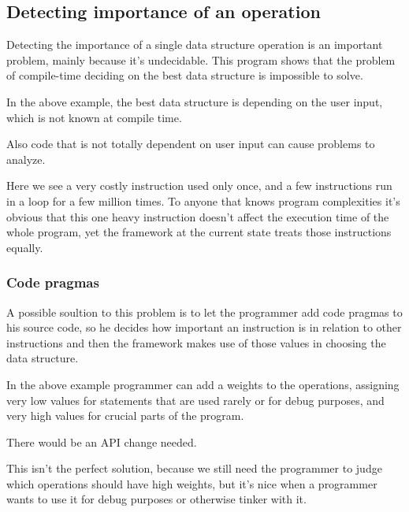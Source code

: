 \documentclass[11pt]{article}
\begin{document}
	\subsection{Detecting importance of an operation}
		Detecting the importance of a single data structure operation is an important problem, mainly because it's undecidable.
		This program shows that the problem of compile-time deciding on the best data structure is impossible to solve.
		
		In the above example, the best data structure is depending on the user input, which is not known at compile time.

		Also code that is not totally dependent on user input can cause problems to analyze.
		
		Here we see a very costly instruction used only once, and a few instructions run in a loop for a few million times.
		To anyone that knows program complexities it's obvious that this one heavy instruction
		doesn't affect the execution time of the whole program, yet the framework at the current state
		treats those instructions equally.

		\subsubsection{Code pragmas}
			A possible soultion to this problem is to let the programmer add code pragmas to his source code,
			so he decides how important an instruction is in relation to other instructions and then the framework
			makes use of those values in choosing the data structure.
			
			In the above example programmer can add a weights to the operations,
			assigning very low values for statements that are used rarely or for debug purposes,
			and very high values for crucial parts of the program.

			There would be an API change needed.
			
			This isn't the perfect solution, because we still need the programmer to judge
			which operations should have high weights, but it's nice when a programmer
			wants to use it for debug purposes or otherwise tinker with it.
\end{document}
